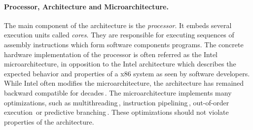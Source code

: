 \paragraph{Processor, Architecture and Microarchitecture.}
%
The main component of the architecture is the \emph{processor}.
%
It embeds several execution units called \emph{cores}.
%
They are responsible for executing sequences of assembly instructions which form
software components programs.
%
The concrete hardware implementation of the processor is often referred as the
Intel microarchitecture, in opposition to the Intel architecture which describes
the expected behavior and properties of a x86 system as seen by software
developers.
%
While Intel often modifies the microarchitecture, the architecture has remained
backward compatible for decades\,\cite{turley2014introx86}.
%
The microarchitecture implements many optimizations, such as
multithreading\,\cite{marr2002hypertheading}, instruction
pipelining\,\cite{fog2012microarchitecture}, out-of-order
execution\,\cite[Section 2]{fog2012microarchitecture} or predictive
branching\,\cite{milenkovic2002branchprediction}\cite[Section
3]{fog2012microarchitecture}.
%
These optimizations should not violate properties of the architecture.
%
